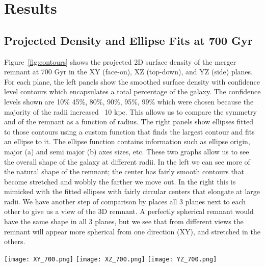 \documentclass[usenatbib]{mnras}
\begin{document}
\section{Results}

\subsection{Projected Density and Ellipse Fits at 700 Gyr}

Figure~\ref{fig:contours} shows the projected 2D surface density of the merger remnant at 700 Gyr in the XY (face-on), XZ (top-down), and YZ (side) planes. For each plane, the left panels show the smoothed surface density with confidence level contours which encapsulates a total percentage of the galaxy. The confidence levels shown are 10\% 45\%, 80\%, 90\%, 95\%, 99\% which were chosen because the majority of the radii increased ~10 kpc. This allows us to compare the symmetry and of the remnant as a function of radius. The right panels show ellipses fitted to those contours using a custom function that finds the largest contour and fits an ellipse to it. The ellipse function contains information such as ellipse origin, major (a) and semi major (b) axes sizes, etc. These two graphs allow us to see the overall shape of the galaxy at different radii. In the left we can see more of the natural shape of the remnant; the center has fairly smooth contours that become stretched and wobbly the farther we move out. In the right this is mimicked with the fitted ellipses with fairly circular centers that elongate at large radii. We have another step of comparison by places all 3 planes next to each other to give us a view of the 3D remnant. A perfectly spherical remnant would have the same shape in all 3 planes, but we see that from different views the remnant will appear more spherical from one direction (XY), and stretched in the others.  

\begin{figure*}
    \centering
    \texttt{[image: XY\_700.png]}
    \texttt{[image: XZ\_700.png]}
    \texttt{[image: YZ\_700.png]}
    \caption{
    \textbf{Surface Density and Ellipse Fits for the Remnant at 700 Gyr.}
    Each row shows a 2D projection of the system: XY (top), XZ (middle), and YZ (bottom). 
    Left: Smoothed surface density maps with overlaid confidence-level contours, where the colorbar shows $\log_{10}$(surface density).
    Right: Ellipses fitted to the contours from the left panel, color-coded by contour level.
    Axis labels are in kpc. 
    \textit The remnant becomes increasingly elongated with radius.
    }
    \label{fig:contours}
\end{figure*}
\end{document}
